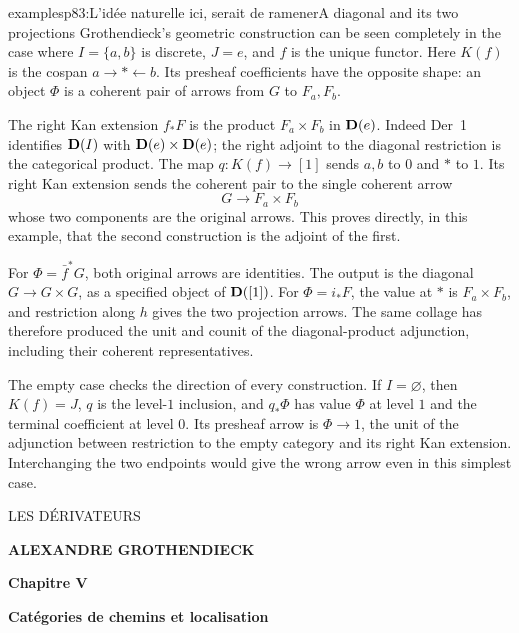 \begin{dcomment}{examples}{p83:L'idée naturelle ici, serait de ramener}{A diagonal and its two projections}
Grothendieck's geometric construction can be seen completely in the case where \(I=\{a,b\}\) is discrete, \(J=e\), and \(f\) is the unique functor. Here \(K(f)\) is the cospan \(a\to *\leftarrow b\). Its presheaf coefficients have the opposite shape: an object \(\Phi\) is a coherent pair of arrows from \(G\) to \(F_a,F_b\).

The right Kan extension \(f_*F\) is the product \(F_a\times F_b\) in \(\mathbf{D}(e)\). Indeed Der~1 identifies \(\mathbf{D}(I)\) with \(\mathbf{D}(e)\times\mathbf{D}(e)\); the right adjoint to the diagonal restriction is the categorical product. The map \(q:K(f)\to[1]\) sends \(a,b\) to \(0\) and \(*\) to \(1\). Its right Kan extension sends the coherent pair to the single coherent arrow
\[
 G\longrightarrow F_a\times F_b
\]
whose two components are the original arrows. This proves directly, in this example, that the second construction is the adjoint of the first.

For \(\Phi=\bar f^*G\), both original arrows are identities. The output is the diagonal \(G\to G\times G\), as a specified object of \(\mathbf{D}([1])\). For \(\Phi=i_*F\), the value at \(*\) is \(F_a\times F_b\), and restriction along \(h\) gives the two projection arrows. The same collage has therefore produced the unit and counit of the diagonal-product adjunction, including their coherent representatives.

The empty case checks the direction of every construction. If \(I=\varnothing\), then \(K(f)=J\), \(q\) is the level-\(1\) inclusion, and \(q_*\Phi\) has value \(\Phi\) at level \(1\) and the terminal coefficient at level \(0\). Its presheaf arrow is \(\Phi\to1\), the unit of the adjunction between restriction to the empty category and its right Kan extension. Interchanging the two endpoints would give the wrong arrow even in this simplest case.
\end{dcomment}
\printedpage{}

\begin{center}
\vspace*{6cm}

{\LARGE\textsf{LES DÉRIVATEURS}}

\vspace{1.5cm}

{\large\textbf{ALEXANDRE GROTHENDIECK}}

\vspace{2.5cm}

{\large\textbf{Chapitre V}}

\vspace{0.4cm}

{\large\textbf{Catégories de chemins et localisation}}
\end{center}


